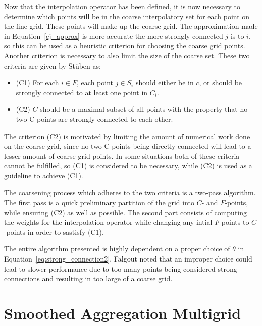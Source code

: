 Now that the interpolation operator has been defined, it is now necessary to determine which points will be in the coarse interpolatory set for each point on the fine grid. These points will make up the coarse grid. The approximation made in Equation~\ref{ej_approx} is more accurate the more strongly connected $j$ is to $i$, so this can be used as a heuristic criterion for choosing the coarse grid points. Another criterion is necessary to also limit the size of the coarse set. These two criteria are given by Stüben as:

\begin{itemize}
	\item (C1) For each $i \in F$, each point $j \in S_i$ should either be in $c$, or should be strongly connected to at least one point in $C_i$.
	\item (C2) $C$ should be a maximal subset of all points with the property that no two C-points are strongly connected to each other.
\end{itemize}

The criterion (C2) is motivated by limiting the amount of numerical work done on the coarse grid, since no two C-points being directly connected will lead to a lesser amount of coarse grid points. In some situations both of these criteria cannot be fulfilled, so (C1) is considered to be necessary, while (C2) is used as a guideline to achieve (C1).

The coarsening process which adheres to the two criteria is a two-pass algorithm. The first pass is a quick preliminary partition of the grid into $C$- and $F$-points, while ensuring (C2) as well as possible. The second part consists of computing the weights for the interpolation operator while changing any intial $F$-points to $C$-points in order to sastisfy (C1).


The entire algorithm presented is highly dependent on a proper choice of $\theta$ in Equation~\ref{eq:strong_connection2}. Falgout noted that an improper choice could lead to slower performance due to too many points being considered strong connections and resulting in too large of a coarse grid.



\section{Smoothed Aggregation Multigrid}

